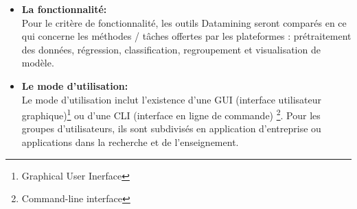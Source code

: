 \begin{itemize}
    \item[\ding{233}] \textbf{La fonctionnalité:}\\
    Pour le critère de fonctionnalité, les outils Datamining seront comparés en ce qui concerne les méthodes / tâches offertes par les plateformes : prétraitement des données, régression, classification, regroupement et visualisation de modèle.
    \\
    
    \item[\ding{233}] \textbf{Le mode d'utilisation:}\\
    Le mode d'utilisation inclut l’existence d'une GUI (interface utilisateur graphique)\footnote{Graphical User Inerface} ou d'une CLI (interface en ligne de commande) \footnote{Command-line interface}. Pour les groupes d’utilisateurs, ils sont subdivisés en  application d’entreprise ou applications dans la recherche et de l'enseignement.\\
    
\end{itemize}
